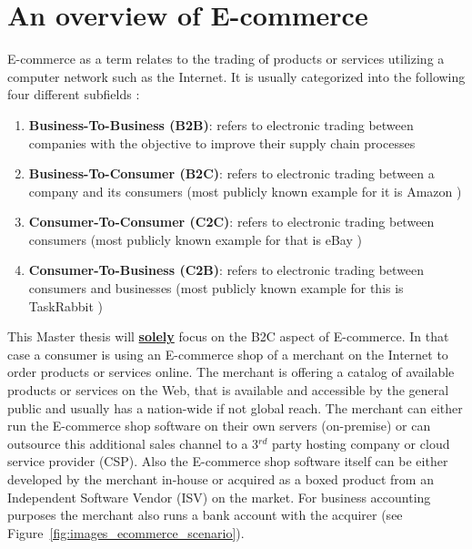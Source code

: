 
\section{An overview of E-commerce}
\label{sec:e_commerce_scenario}

\gls{E-commerce} as a term relates to the trading of products or services utilizing a computer network such as the Internet. It is usually categorized into the following four different subfields \citep{sen2015study}:\@

\begin{enumerate}
  \item \textbf{Business-To-Business (\gls{B2B})}: refers to electronic trading between companies with the objective to improve their supply chain processes
  \item \textbf{Business-To-Consumer (\gls{B2C})}: refers to electronic trading between a company and its consumers (most publicly known example for it is Amazon \citep{Amazon.com})
  \item \textbf{Consumer-To-Consumer (\gls{C2C})}: refers to electronic trading between consumers (most publicly known example for that is eBay \citep{eBayInc})
  \item \textbf{Consumer-To-Business (\gls{C2B})}: refers to electronic trading between consumers and businesses (most publicly known example for this is TaskRabbit \citep{TaskRabbit})
\end{enumerate}

This Master thesis will \textbf{\underline{solely}} focus on the \gls{B2C} aspect of \gls{E-commerce}. In that case a consumer is using an \gls{E-commerce} shop of a merchant on the Internet to order products or services online. The merchant is offering a catalog of available products or services on the Web, that is available and accessible by the general public and usually has a nation-wide if not global reach. The merchant can either run the \gls{E-commerce} shop software on their own servers (on-premise) or can outsource this additional sales channel to a 3$^{rd}$ party hosting company or cloud service provider (\gls{CSP}). Also the \gls{E-commerce} shop software itself can be either developed by the merchant in-house or acquired as a boxed product from an Independent Software Vendor (\gls{ISV}) on the market. For business accounting purposes the merchant also runs a bank account with the acquirer (see Figure~\ref{fig:images_ecommerce_scenario}). \\

